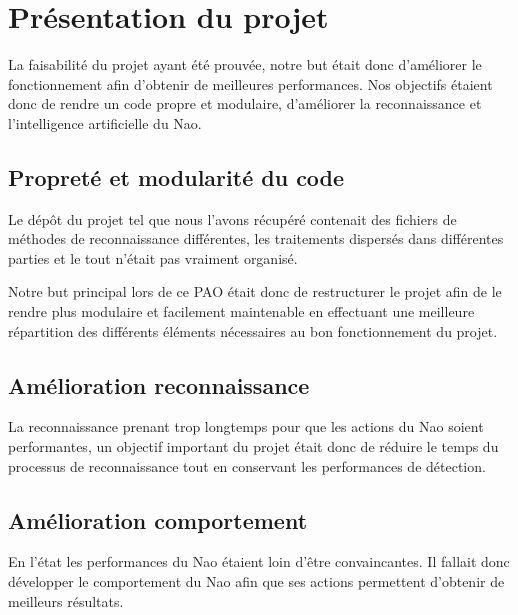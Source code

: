 \section{Présentation du projet}
\label{sec:Présentation du projet}

\par La faisabilité du projet ayant été prouvée, notre but était donc d'améliorer le fonctionnement afin d'obtenir de meilleures performances. Nos objectifs étaient donc de rendre un code propre et modulaire, d'améliorer la reconnaissance et l'intelligence artificielle du Nao.

\subsection{Propreté et modularité du code}
\par Le dépôt du projet tel que nous l'avons récupéré contenait des fichiers  de méthodes de reconnaissance différentes, les traitements dispersés dans différentes parties et le tout n'était pas vraiment organisé.

\par Notre but principal lors de ce PAO était donc de restructurer le projet afin de le rendre plus modulaire et facilement maintenable en effectuant une meilleure répartition des différents éléments nécessaires au bon fonctionnement du projet.
    
\subsection{Amélioration reconnaissance}
\par La reconnaissance prenant trop longtemps pour que les actions du Nao soient performantes, un objectif important du projet était donc de réduire le temps du processus de reconnaissance tout en conservant les performances de détection.

\subsection{Amélioration comportement}
\par En l'état les performances du Nao étaient loin d'être convaincantes. Il fallait donc développer le comportement du Nao afin que ses actions permettent d'obtenir de meilleurs résultats.
\pagebreak
